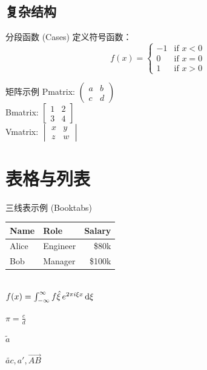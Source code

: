 \documentclass[UTF8]{ctexart}
\begin{document}
	\subsection{复杂结构}
	
\begin{code-top}{分段函数 (Cases)}
定义符号函数：
\[
f(x) = 
\begin{cases} 
-1 & \text{if } x < 0 \\
0  & \text{if } x = 0 \\
1  & \text{if } x > 0
\end{cases}
\]
	\end{code-top}
	
	\begin{code-left}[lefthand width=0.68\textwidth]{矩阵示例}
Pmatrix: $\begin{pmatrix} a & b \\ c & d \end{pmatrix}$ \\[5pt]
Bmatrix: $\begin{bmatrix} 1 & 2 \\ 3 & 4 \end{bmatrix}$ \\[5pt]
Vmatrix: $\begin{vmatrix} x & y \\ z & w \end{vmatrix}$
	\end{code-left}
	
	\section{表格与列表}
	
	\begin{code-top}{三线表示例 (Booktabs)}
\begin{tabular}{llr}
\toprule
Name & Role & Salary \\
\midrule
Alice & Engineer & \$80k \\
Bob   & Manager  & \$100k \\
\bottomrule
\end{tabular}
\\
$f\relax(x) = \int_{-\infty}^\infty
f\hat\xi\,e^{2 \pi i \xi x}
\,\mathrm{d}\xi $

$\boxed{\pi=\frac c d}$
\end{code-top}


\begin{code-left}

$\tilde{a}$

$\widetilde{ac}, a', \overrightarrow{AB} $


\end{code-left}

	
\end{document}
